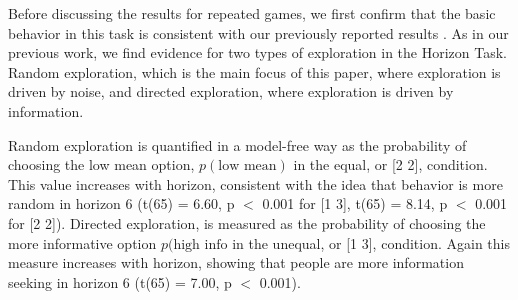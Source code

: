 \documentclass[12pt]{article}
\begin{document}
	Before discussing the results for repeated games, we first confirm that the basic behavior in this task is consistent with our previously reported results \citep{wilson2014}. As in our previous work, we find evidence for two types of exploration in the Horizon Task.  Random exploration, which is the main focus of this paper, where exploration is driven by noise, and directed exploration, where exploration is driven by information. 
	
	Random exploration is quantified in a model-free way as the probability of choosing the low mean option, $p(\mbox{low mean})$ in the equal, or [2 2], condition. This value increases with horizon, consistent with the idea that behavior is more random in horizon 6 (t(65) = 6.60, p $<$ 0.001 for [1 3], t(65) = 8.14, p $<$ 0.001 for [2 2]).  Directed exploration, is measured as the probability of choosing the more informative option $p(\mbox{high info}$ in the unequal, or [1 3], condition. Again this measure increases with horizon, showing that people are more information seeking in horizon 6 (t(65) = 7.00, p $<$ 0.001).
	
	
	
	
	
\end{document}
